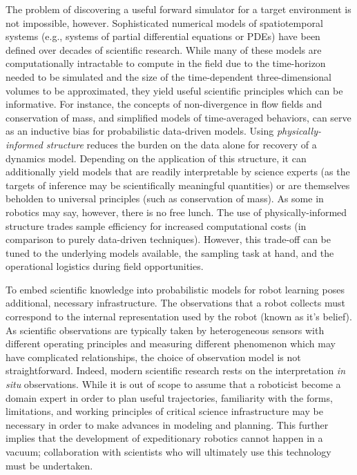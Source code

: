 The problem of discovering a useful forward simulator for a target environment is not impossible, however.
Sophisticated numerical models of spatiotemporal systems (e.g., systems of partial differential equations or PDEs) have been defined over decades of scientific research.
While many of these models are computationally intractable to compute in the field due to the time-horizon needed to be simulated and the size of the time-dependent three-dimensional volumes to be approximated, they yield useful scientific principles which can be informative.
For instance, the concepts of non-divergence in flow fields and conservation of mass, and simplified models of time-averaged behaviors, can serve as an inductive bias for probabilistic data-driven models.
Using \emph{physically-informed structure} reduces the burden on the data alone for recovery of a dynamics model.
Depending on the application of this structure, it can additionally yield models that are readily interpretable by science experts (as the targets of inference may be scientifically meaningful quantities) or are themselves beholden to universal principles (such as conservation of mass).
As some in robotics may say, however, there is no free lunch.
The use of physically-informed structure trades sample efficiency for increased computational costs (in comparison to purely data-driven techniques).
However, this trade-off can be tuned to the underlying models available, the sampling task at hand, and the operational logistics during field opportunities.

To embed scientific knowledge into probabilistic models for robot learning poses additional, necessary infrastructure.
The observations that a robot collects must correspond to the internal representation used by the robot (known as it's belief).
As scientific observations are typically taken by heterogeneous sensors with different operating principles and measuring different phenomenon which may have complicated relationships, the choice of observation model is not straightforward.
Indeed, modern scientific research rests on the interpretation \emph{in situ} observations.
While it is out of scope to assume that a roboticist become a domain expert in order to plan useful trajectories, familiarity with the forms, limitations, and working principles of critical science infrastructure may be necessary in order to make advances in modeling and planning.
This further implies that the development of expeditionary robotics cannot happen in a vacuum; collaboration with scientists who will ultimately use this technology must be undertaken.

